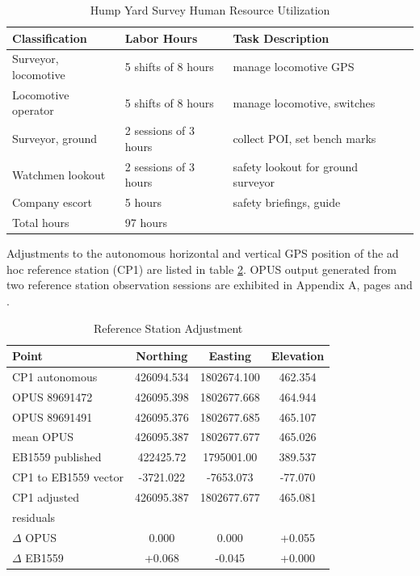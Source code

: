 \begin{table}[ht]
\begin{center}
	\caption{Hump Yard Survey Human Resource Utilization}\label{tab:labor}
	\begin{tabular}{llll}
	\toprule
	Classification & Labor Hours & Task Description\\
	\midrule
	Surveyor, locomotive & 5 shifts of 8 hours & manage locomotive GPS  & \\
	Locomotive operator & 5 shifts of 8 hours & manage locomotive, switches & \\
	Surveyor, ground & 2 sessions of 3 hours & collect POI, set bench marks & \\
	Watchmen lookout & 2 sessions of 3 hours & safety lookout for ground surveyor\\
	Company escort & 5 hours & safety briefings, guide\\
	\bottomrule
	Total hours & 97 hours &
	\end{tabular}
\end{center}
\end{table}

Adjustments to the autonomous horizontal and vertical GPS position of the ad hoc reference station (CP1) are listed in table \ref{tab:AdHocPos}. OPUS output generated from two reference station observation sessions are exhibited in Appendix A, pages \pageref{opus1} and \pageref{opus2}.
\begin{table}
\begin{center}
	\caption{Reference Station Adjustment}
	\label{tab:AdHocPos}
	\begin{tabular}{l c c c}
	\toprule
	Point & Northing & Easting & Elevation\\
	\midrule
	CP1 autonomous & 426094.534 & 1802674.100 & 462.354 \\
	OPUS 89691472 & 426095.398 & 1802677.668 & 464.944  \\
	OPUS 89691491 & 426095.376 & 1802677.685 & 465.107  \\
	mean OPUS & 426095.387 & 1802677.677 & 465.026 \\
	\midrule
	EB1559 published& 422425.72 & 1795001.00 & 389.537 \\
	CP1 to EB1559 vector & -3721.022 & -7653.073 & -77.070 \\
	\midrule
	CP1 adjusted & 426095.387 & 1802677.677 & 465.081\tnote{} \\
	\midrule
	residuals&&&\\
	$\Delta$ OPUS & 0.000 & 0.000 & +0.055\\
	$\Delta$ EB1559 & +0.068 & -0.045 & +0.000\\
	\bottomrule
	\end{tabular}
\end{center}
\end{table}

